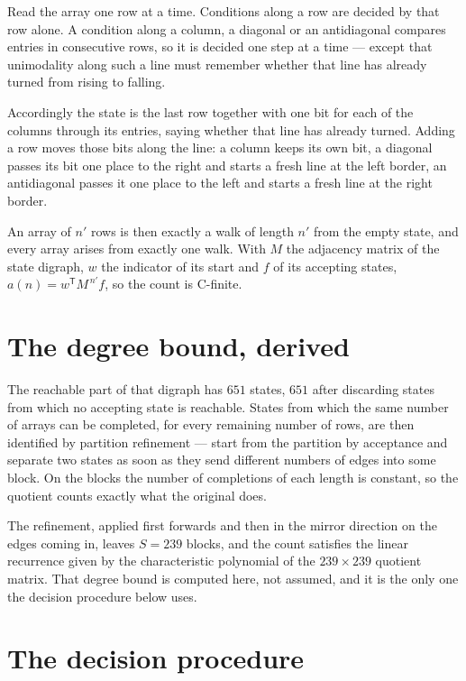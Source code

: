 \documentclass[11pt]{article}
\theoremstyle{definition}
\begin{document}
Read the array one row at a time. Conditions along a row are decided by that row alone. A condition along a column, a diagonal or an antidiagonal compares entries in consecutive rows, so it is decided one step at a time --- except that unimodality along such a line must remember whether that line has already turned from rising to falling.

Accordingly the state is the last row together with one bit for each of the columns through its entries, saying whether that line has already turned. Adding a row moves those bits along the line: a column keeps its own bit, a diagonal passes its bit one place to the right and starts a fresh line at the left border, an antidiagonal passes it one place to the left and starts a fresh line at the right border.

An array of $n'$ rows is then exactly a walk of length $n'$ from the empty state, and every array arises from exactly one walk. With $M$ the adjacency matrix of the state digraph, $w$ the indicator of its start and $f$ of its accepting states, $a(n) = w^{\mathsf T}M^{\,n'}f$, so the count is C-finite.

\section{The degree bound, derived}

The reachable part of that digraph has $651$ states, $651$ after discarding states from which no accepting state is reachable. States from which the same number of arrays can be completed, for every remaining number of rows, are then identified by partition refinement --- start from the partition by acceptance and separate two states as soon as they send different numbers of edges into some block. On the blocks the number of completions of each length is constant, so the quotient counts exactly what the original does.

The refinement, applied first forwards and then in the mirror direction on the edges coming in, leaves $S = 239$ blocks, and the count satisfies the linear recurrence given by the characteristic polynomial of the $239 \times 239$ quotient matrix. That degree bound is computed here, not assumed, and it is the only one the decision procedure below uses.

\section{The decision procedure}
\end{document}
